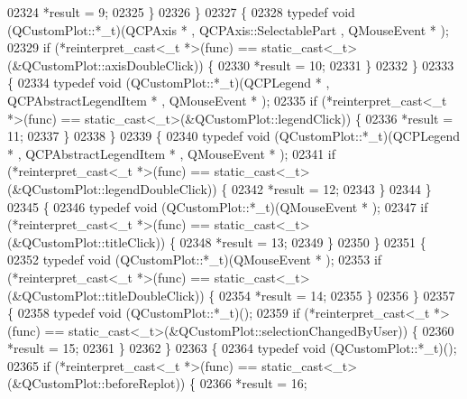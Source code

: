 \begin{DoxyCode}
02324                 *result = 9;
02325             \}
02326         \}
02327         \{
02328             \textcolor{keyword}{typedef} void (QCustomPlot::*\_t)(QCPAxis * , QCPAxis::SelectablePart , QMouseEvent * );
02329             \textcolor{keywordflow}{if} (*reinterpret\_cast<\_t *>(func) == \textcolor{keyword}{static\_cast<}\_t\textcolor{keyword}{>}(&QCustomPlot::axisDoubleClick)) \{
02330                 *result = 10;
02331             \}
02332         \}
02333         \{
02334             \textcolor{keyword}{typedef} void (QCustomPlot::*\_t)(QCPLegend * , QCPAbstractLegendItem * , QMouseEvent * );
02335             \textcolor{keywordflow}{if} (*reinterpret\_cast<\_t *>(func) == \textcolor{keyword}{static\_cast<}\_t\textcolor{keyword}{>}(&QCustomPlot::legendClick)) \{
02336                 *result = 11;
02337             \}
02338         \}
02339         \{
02340             \textcolor{keyword}{typedef} void (QCustomPlot::*\_t)(QCPLegend * , QCPAbstractLegendItem * , QMouseEvent * );
02341             \textcolor{keywordflow}{if} (*reinterpret\_cast<\_t *>(func) == \textcolor{keyword}{static\_cast<}\_t\textcolor{keyword}{>}(&QCustomPlot::legendDoubleClick)) \{
02342                 *result = 12;
02343             \}
02344         \}
02345         \{
02346             \textcolor{keyword}{typedef} void (QCustomPlot::*\_t)(QMouseEvent * );
02347             \textcolor{keywordflow}{if} (*reinterpret\_cast<\_t *>(func) == \textcolor{keyword}{static\_cast<}\_t\textcolor{keyword}{>}(&QCustomPlot::titleClick)) \{
02348                 *result = 13;
02349             \}
02350         \}
02351         \{
02352             \textcolor{keyword}{typedef} void (QCustomPlot::*\_t)(QMouseEvent * );
02353             \textcolor{keywordflow}{if} (*reinterpret\_cast<\_t *>(func) == \textcolor{keyword}{static\_cast<}\_t\textcolor{keyword}{>}(&QCustomPlot::titleDoubleClick)) \{
02354                 *result = 14;
02355             \}
02356         \}
02357         \{
02358             \textcolor{keyword}{typedef} void (QCustomPlot::*\_t)();
02359             \textcolor{keywordflow}{if} (*reinterpret\_cast<\_t *>(func) == \textcolor{keyword}{static\_cast<}\_t\textcolor{keyword}{>}(&QCustomPlot::selectionChangedByUser)) \{
02360                 *result = 15;
02361             \}
02362         \}
02363         \{
02364             \textcolor{keyword}{typedef} void (QCustomPlot::*\_t)();
02365             \textcolor{keywordflow}{if} (*reinterpret\_cast<\_t *>(func) == \textcolor{keyword}{static\_cast<}\_t\textcolor{keyword}{>}(&QCustomPlot::beforeReplot)) \{
02366                 *result = 16;

\end{DoxyCode}
